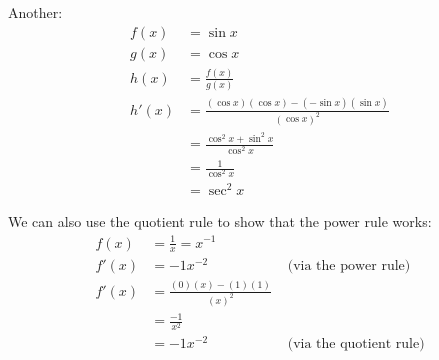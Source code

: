 \documentclass[12pt, letterpaper]{article}
\begin{document}
Another:
\begin{align*}
    f(x) &= \sin x \\
    g(x) &= \cos x \\
    h(x) &= \frac{f(x)}{g(x)} \\
    h'(x) &= \frac{(\cos x)(\cos x) - (-\sin x)(\sin x)}{(\cos x)^2} \\
    &= \frac{\cos^2 x + \sin^2 x}{\cos^2 x} \\
    &= \frac{1}{\cos^2 x} \\
    &= \boxed{\sec^2 x}
\end{align*}

We can also use the quotient rule to show that the power rule works:
\begin{align*}
    f(x) &= \frac{1}{x} = x^{-1} \\
    f'(x) &= -1x^{-2} & \text{ (via the power rule)} \\
    f'(x) &= \frac{(0)(x)-(1)(1)}{(x)^2} \\
    &= \frac{-1}{x^2} \\
    &= -1x^{-2} & \text{ (via the quotient rule)}
\end{align*}
\end{document}
